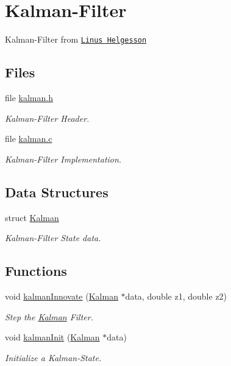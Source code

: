 \hypertarget{group__kalman}{\section{Kalman-\/\-Filter}
\label{group__kalman}
}


Kalman-\/\-Filter from \href{http://www.linushelgesson.se/2012/04/pitch-and-roll-estimating-kalman-filter-for-stabilizing-quadrocopters/}{\tt Linus Helgesson}  


\subsection*{Files}
\begin{DoxyCompactItemize}
\item 
file \hyperlink{kalman_8h}{kalman.\-h}
\begin{DoxyCompactList}\small\item\em Kalman-\/\-Filter Header. \end{DoxyCompactList}\item 
file \hyperlink{kalman_8c}{kalman.\-c}
\begin{DoxyCompactList}\small\item\em Kalman-\/\-Filter Implementation. \end{DoxyCompactList}\end{DoxyCompactItemize}
\subsection*{Data Structures}
\begin{DoxyCompactItemize}
\item 
struct \hyperlink{struct_kalman}{Kalman}
\begin{DoxyCompactList}\small\item\em Kalman-\/\-Filter State data. \end{DoxyCompactList}\end{DoxyCompactItemize}
\subsection*{Functions}
\begin{DoxyCompactItemize}
\item 
void \hyperlink{group__kalman_ga008ac0878fbd45cbf8403f52387a34d1}{kalman\-Innovate} (\hyperlink{struct_kalman}{Kalman} $\ast$data, double z1, double z2)
\begin{DoxyCompactList}\small\item\em Step the \hyperlink{struct_kalman}{Kalman} Filter. \end{DoxyCompactList}\item 
void \hyperlink{group__kalman_ga89613fd996739650842bef0089c28cb9}{kalman\-Init} (\hyperlink{struct_kalman}{Kalman} $\ast$data)
\begin{DoxyCompactList}\small\item\em Initialize a Kalman-\/\-State. \end{DoxyCompactList}\end{DoxyCompactItemize}


